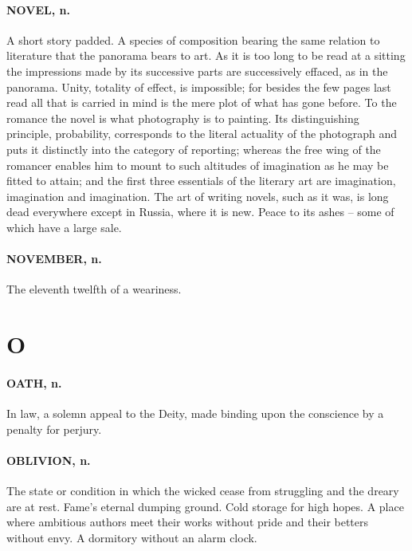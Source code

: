\documentclass[11pt]{article}
\begin{document}
\paragraph{NOVEL, n.}  A short story padded.  A species of composition bearing the
same relation to literature that the panorama bears to art.  As it is
too long to be read at a sitting the impressions made by its
successive parts are successively effaced, as in the panorama.  Unity,
totality of effect, is impossible; for besides the few pages last read
all that is carried in mind is the mere plot of what has gone before.
To the romance the novel is what photography is to painting.  Its
distinguishing principle, probability, corresponds to the literal
actuality of the photograph and puts it distinctly into the category
of reporting; whereas the free wing of the romancer enables him to
mount to such altitudes of imagination as he may be fitted to attain;
and the first three essentials of the literary art are imagination,
imagination and imagination.  The art of writing novels, such as it
was, is long dead everywhere except in Russia, where it is new.  Peace
to its ashes -- some of which have a large sale.

\paragraph{NOVEMBER, n.}  The eleventh twelfth of a weariness.



\section*{O}



\paragraph{OATH, n.}  In law, a solemn appeal to the Deity, made binding upon the
conscience by a penalty for perjury.

\paragraph{OBLIVION, n.}  The state or condition in which the wicked cease from
struggling and the dreary are at rest.  Fame's eternal dumping ground.
Cold storage for high hopes.  A place where ambitious authors meet
their works without pride and their betters without envy.  A dormitory
without an alarm clock.
\end{document}
